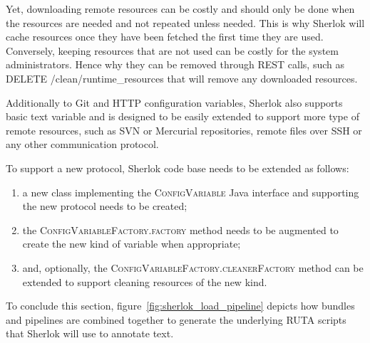 \documentclass{article}
\newcommand{\ID}[1]{{\textsc{#1}}}
\newcommand{\REST}[1]{\textsf{#1}}
\begin{document}
Yet, downloading remote resources can be costly and should only be done when the resources are
needed and not repeated unless needed. This is why Sherlok will cache resources once they have been
fetched the first time they are used. Conversely, keeping resources that are not used can be costly
for the system administrators. Hence why they can be removed through REST calls, such as \REST{DELETE
/clean/runtime\_resources} that will remove any downloaded resources.

Additionally to Git and HTTP configuration variables, Sherlok also supports basic text variable and
is designed to be easily extended to support more type of remote resources, such as SVN or Mercurial
repositories, remote files over SSH or any other communication protocol.

To support a new protocol, Sherlok code base needs to be extended as follows:

\begin{enumerate}
    \item a new class implementing the \ID{ConfigVariable} Java interface and supporting the new
        protocol needs to be created;
    \item the \ID{ConfigVariableFactory.factory} method needs to be augmented to create the new kind of
        variable when appropriate;
    \item and, optionally, the \ID{ConfigVariableFactory.cleanerFactory} method can be extended to
        support cleaning resources of the new kind.
\end{enumerate}

To conclude this section, figure~\ref{fig:sherlok_load_pipeline} depicts how bundles and pipelines
are combined together to generate the underlying RUTA scripts that Sherlok will use to annotate text.
\end{document}
